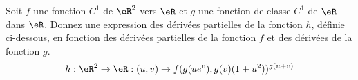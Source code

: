 
\begin{exercice}\label{exo0056}

Soit $f$ une fonction $C^1$ de $\eR^2$ vers $\eR$ et $g$ une
fonction de classe $C^1$ de $\eR$ dans $\eR$. Donnez une expression des
dérivées partielles de la fonction $h$, définie ci-dessous, en
fonction des dérivées partielles de la fonction $f$ et des dérivées
de la fonction $g$.
\[
h: \eR^2 \rightarrow \eR:(u,v) \rightarrow f(g(ue^v),g(v)(1+u^2))^{g(u+v)}
\]

\end{exercice}
